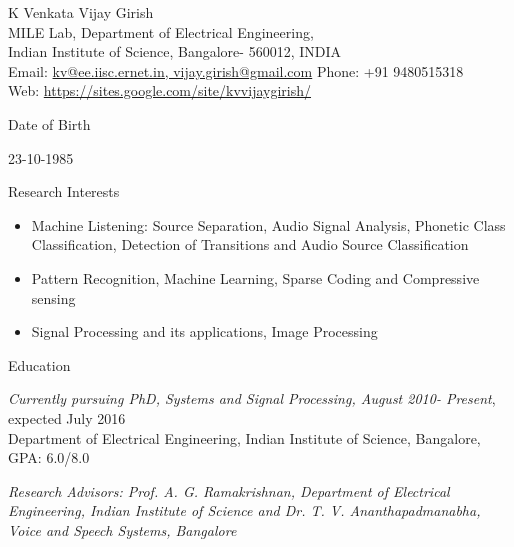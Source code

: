 \documentclass[10pt]{article}
\newenvironment{subbulletlist}{%
	\begin{list}{\labelitemii}{%
		\setlength{\topsep}{\itemsep}\setlength{\parskip}{\parsep}%
	}%
}%
{ \end{list} }
\begin{document}
\newlength{\oldcvlabelwidth}
\newlength{\oldcvlabelsep}

\begin{cv}{{\large K Venkata Vijay Girish}\\
{\normalsize  MILE Lab, Department of Electrical Engineering, \\Indian Institute of Science, Bangalore- 560012, INDIA
\\
Email: {\mdseries \href{mailto:vijay.girish@gmail.com}
	{kv@ee.iisc.ernet.in, vijay.girish@gmail.com}}
\hfill Phone: {\mdseries +91 9480515318} \hfill \\
Web: {\mdseries \href{https://sites.google.com/site/kvvijaygirish/}
	{https://sites.google.com/site/kvvijaygirish/}}}
}

\setlength{\oldcvlabelwidth}{\cvlabelwidth}
\setlength{\oldcvlabelsep}{\cvlabelsep}

\setlength{\cvlabelwidth}{1em}


\setlength{\cvlabelwidth}{0em}
\setlength{\cvlabelsep}{\labelsep}
\begin{cvlist}{Date of Birth}\item
23-10-1985
\end{cvlist}
\begin{cvlist}{Research Interests}\item
\begin{itemize}\itemsep=0.25em
 
 \item Machine Listening: Source Separation, Audio Signal Analysis,  Phonetic Class Classification, Detection of Transitions and Audio Source Classification	 

\item Pattern Recognition, Machine Learning, Sparse Coding and Compressive sensing
\item Signal Processing and its applications, Image Processing
\end{itemize}
\end{cvlist}


\begin{cvlist}{Education}
	\item \emph{Currently pursuing PhD, Systems and Signal Processing, August 2010- Present}, expected July 2016\\
	Department of Electrical
Engineering, Indian Institute of Science, Bangalore, GPA: 6.0/8.0
	\begin{subbulletlist}
		\item \emph{Research Advisors: Prof. A. G. Ramakrishnan, Department of Electrical Engineering, Indian Institute of Science and Dr. T. V. Ananthapadmanabha, Voice and Speech Systems, Bangalore
}
		

\end{subbulletlist}
\end{cvlist}
\end{cv}
\end{document}
